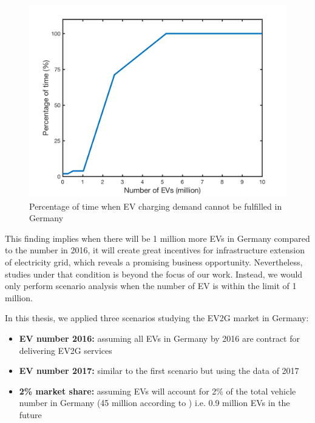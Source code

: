 \begin{figure}[h!]
	\centering
	\includegraphics[width=0.95\linewidth]{Figures/EV_nan_percentage}
	\caption{Percentage of time when EV charging demand cannot be fulfilled in Germany}
	\label{fig:EV_nan_percentageg}
\end{figure}

This finding implies when there will be 1 million more EVs in Germany compared to the number in 2016, it will create great incentives for infrastructure extension of electricity grid, which reveals a promising business opportunity. Nevertheless, studies under that condition is beyond the focus of our work. Instead, we would only perform scenario analysis when the number of EV is within the limit of 1 million. 

In this thesis, we applied three scenarios studying the EV2G market in Germany:

\begin{itemize}
	\item \textbf{EV number 2016:} assuming all  EVs in Germany by 2016 are contract for delivering EV2G services
	\item \textbf{EV number 2017:} similar to the first scenario but using the data of 2017
	\item \textbf{2\% market share:} assuming EVs will account for 2\% of the total vehicle number in Germany (45 million according to \cite{Eurostat_de_v}) i.e. 0.9 million EVs in the future
\end{itemize}



